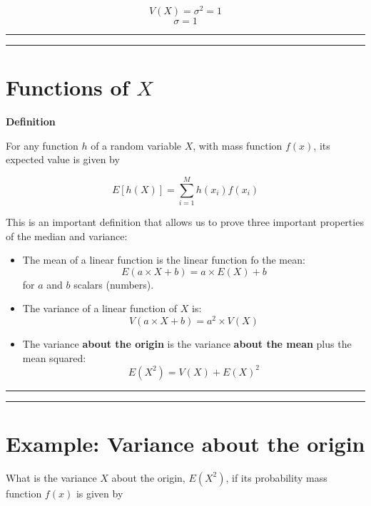 \documentclass[
]{book}
\begin{document}
\[V(X)=\sigma^2=1\]
\[\sigma=1\]

\begin{center}\rule{0.5\linewidth}{0.5pt}\end{center}

\begin{center}\rule{0.5\linewidth}{0.5pt}\end{center}

\hypertarget{functions-of-x}{%
\section{\texorpdfstring{Functions of \(X\)}{Functions of X}}\label{functions-of-x}}

\textbf{Definition}

For any function \(h\) of a random variable \(X\), with mass function \(f(x)\), its expected value is given by

\[ E[h(X)]= \sum_{i=1}^M h(x_i) f(x_i) \]

This is an important definition that allows us to prove three important properties of the median and variance:

\begin{itemize}
\item
  The mean of a linear function is the linear function fo the mean: \[E(a\times X +b)= a\times E(X) +b\] for \(a\) and \(b\) scalars (numbers).
\item
  The variance of a linear function of \(X\) is:\[V(a\times X +b)= a^2\times V(X)\]
\item
  The variance \textbf{about the origin} is the variance \textbf{about the mean} plus the mean squared: \[E(X^2)=V(X)+E(X)^2\]
\end{itemize}

\begin{center}\rule{0.5\linewidth}{0.5pt}\end{center}

\begin{center}\rule{0.5\linewidth}{0.5pt}\end{center}

\hypertarget{example-variance-about-the-origin}{%
\section{Example: Variance about the origin}\label{example-variance-about-the-origin}}

What is the variance \(X\) about the origin, \(E(X^2)\), if its probability mass function \(f(x)\) is given by
\end{document}
